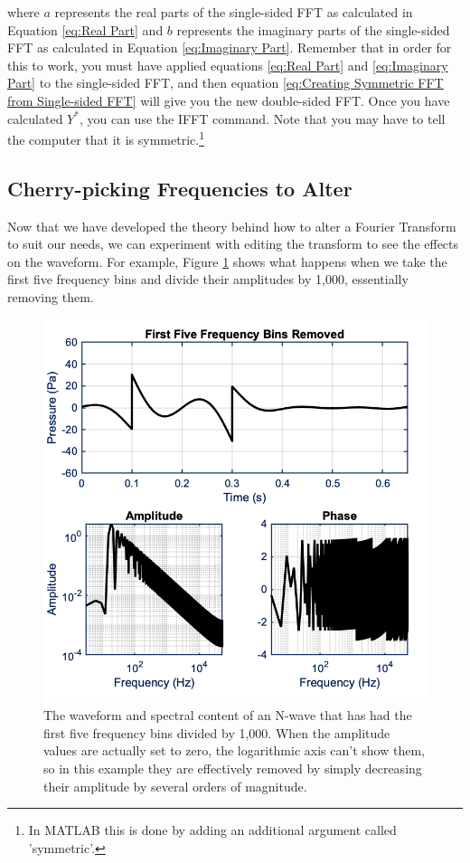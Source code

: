 where $a$ represents the real parts of the single-sided FFT as calculated in Equation \ref{eq:Real Part} and $b$ represents the imaginary parts of the single-sided FFT as calculated in Equation \ref{eq:Imaginary Part}. Remember that in order for this to work, you must have applied equations \ref{eq:Real Part} and \ref{eq:Imaginary Part} to the single-sided FFT, and then equation \ref{eq:Creating Symmetric FFT from Single-sided FFT} will give you the new double-sided FFT. Once you have calculated $Y^*$, you can use the IFFT command. Note that you may have to tell the computer that it is symmetric.\footnote{In MATLAB this is done by adding an additional argument called 'symmetric'.}

\subsection{Cherry-picking Frequencies to Alter}

Now that we have developed the theory behind how to alter a Fourier Transform to suit our needs, we can experiment with editing the transform to see the effects on the waveform. For example, Figure \ref{fig:First Five Frequency Bins Removed} shows what happens when we take the first five frequency bins and divide their amplitudes by 1,000, essentially removing them.

\begin{figure}[H]
    \centering
    \includegraphics[width = 5 in]{Chapters/Signal Processing/Figures/First Five Frequency Bins Removed.png}
    \caption{The waveform and spectral content of an N-wave that has had the first five frequency bins divided by 1,000. When the amplitude values are actually set to zero, the logarithmic axis can't show them, so in this example they are effectively removed by simply decreasing their amplitude by several orders of magnitude.}
    \label{fig:First Five Frequency Bins Removed}
\end{figure}

